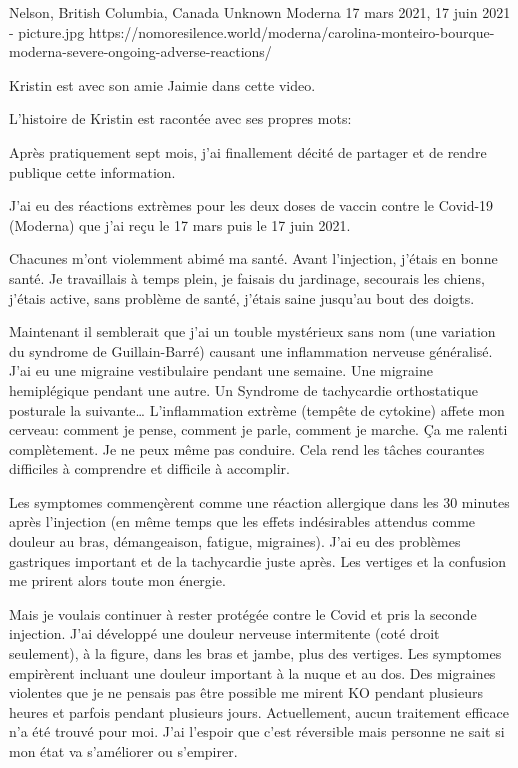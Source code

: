 {Nelson, British Columbia, Canada}
{Unknown}
{Moderna}
{17 mars 2021, 17 juin 2021}
{-}
{picture.jpg}
{https://nomoresilence.world/moderna/carolina-monteiro-bourque-moderna-severe-ongoing-adverse-reactions/}
{

\normalsize

Kristin est avec son amie Jaimie dans cette video.

L'histoire de Kristin est racontée avec ses propres mots:

Après pratiquement sept mois, j'ai finallement décité de partager et de rendre publique cette information.

J'ai eu des réactions extrèmes pour les deux doses de vaccin contre le Covid-19 (Moderna) que j'ai reçu le 17 mars puis le 17 juin 2021.

Chacunes m'ont violemment abimé ma santé. Avant l'injection, j'étais en bonne santé. Je travaillais à temps plein, je faisais du jardinage, secourais les chiens, j'étais active, sans problème de santé, j'étais saine jusqu'au bout des doigts.

Maintenant il semblerait que j'ai un touble mystérieux sans nom (une variation du syndrome de Guillain-Barré) causant une inflammation nerveuse généralisé. J'ai eu une migraine vestibulaire pendant une semaine. Une migraine hemiplégique pendant une autre. Un Syndrome de tachycardie orthostatique posturale la suivante… L'inflammation extrème (tempête de cytokine) affete mon cerveau: comment je pense, comment je parle, comment je marche. Ça me ralenti complètement. Je ne peux même pas conduire. Cela rend les tâches courantes difficiles à comprendre et difficile à accomplir.

Les symptomes commençèrent comme une réaction allergique dans les 30 minutes après l'injection (en même temps que les effets indésirables attendus comme douleur au bras, démangeaison, fatigue, migraines). J'ai eu des problèmes gastriques important et de la tachycardie juste après. Les vertiges et la confusion me prirent alors toute mon énergie.

Mais je voulais continuer à rester protégée contre le Covid et pris la seconde injection. J'ai développé une douleur nerveuse intermitente (coté droit seulement), à la figure, dans les bras et jambe, plus des vertiges. Les symptomes empirèrent incluant une douleur important à la nuque et au dos. Des migraines violentes que je ne pensais pas être possible me mirent KO pendant plusieurs heures et parfois pendant plusieurs jours. Actuellement, aucun traitement efficace n'a été trouvé pour moi. J'ai l'espoir que c'est réversible mais personne ne sait si mon état va s'améliorer ou s'empirer.

}

